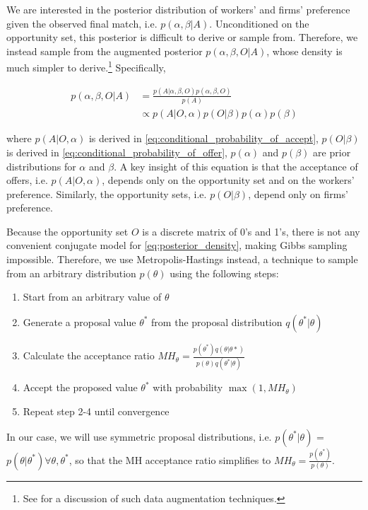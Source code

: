 We are interested in the posterior distribution of workers' and firms'
preference given the observed final match, i.e. $p(\alpha, \beta | A)$.
Unconditioned on the opportunity set, this posterior is difficult to derive or
sample from. Therefore, we instead sample from the augmented posterior
$p(\alpha, \beta, O | A)$, whose density is much simpler to derive.\footnote{See
  \citet{Tanner1987} for a discussion of such data augmentation techniques.}
Specifically,

\begin{align}
  p(\alpha, \beta, O | A) &= \frac{p(A | \alpha, \beta, O) p(\alpha, \beta, O)}{p(A)} \\
                          &\propto p(A|O, \alpha) p(O|\beta) p(\alpha) p(\beta) 
                            \label{eq:posterior_density}
\end{align}

where $p(A|O, \alpha)$ is derived in
\eqref{eq:conditional_probability_of_accept}, $p(O|\beta)$ is derived in
\eqref{eq:conditional_probability_of_offer}, $p(\alpha)$ and $p(\beta)$ are
prior distributions for $\alpha$ and $\beta$. A key insight of this equation is
that the acceptance of offers, i.e. $p(A|O, \alpha)$, depends only on the
opportunity set and on the workers' preference. Similarly, the opportunity sets,
i.e. $p(O|\beta)$, depend only on firms' preference.

Because the opportunity set $O$ is a discrete matrix of 0's and 1's, there is
not any convenient conjugate model for \eqref{eq:posterior_density}, making
Gibbs sampling impossible. Therefore, we use Metropolis-Hastings instead, a
technique to sample from an arbitrary distribution $p(\theta)$ using the
following steps:

\begin{enumerate}
\item Start from an arbitrary value of $\theta$
\item Generate a proposal value $\theta^*$ from the proposal distribution
  $q(\theta^*|\theta)$
\item Calculate the acceptance ratio $MH_{\theta} =
  \frac{p(\theta^*)q(\theta|\theta*)}{p(\theta)q(\theta^*|\theta)}$
\item Accept the proposed value $\theta^*$ with probability $\max(1,
  MH_{\theta})$
\item Repeat step 2-4 until convergence
\end{enumerate}

In our case, we will use symmetric proposal distributions, i.e.
$p(\theta^*|\theta)$ = $p(\theta | \theta^*) \forall \theta, \theta^*$, so that
the MH acceptance ratio simplifies to $MH_{\theta} =
\frac{p(\theta^*)}{p(\theta)}$.

